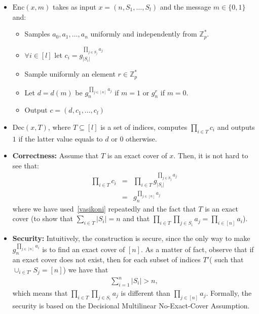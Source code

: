 \begin{itemize}

\item $\mathrm{Enc}(x,m)$ takes as input $x=(n, S_1, \ldots,S_l)$ and the message $m \in \{0,1\}$ and:

\begin{itemize}

\item Samples $a_{0}, a_1, \ldots, a_{n}$ uniformly and independently from $\mathbb{Z}_p^*$.

\item $\forall i \in [l]$ let $c_i = g^{\prod_{j\in S_j} a_j}_{|S_i|}$

\item Sample uniformly an element $r \in \mathbb{Z}_p^*$

\item Let $d = d(m) $ be $  g_n^{\prod_{j \in [n]}a_j}$ if $m = 1 $ or $g_n^r$ if $m = 0$.

\item Output $c = (d, c_1, \ldots,c_l)$
\end{itemize}

\item $\mathrm{Dec}(x,T)$, where $T \subseteq[l]$ is a set of indices, computes $\prod_{i \in T}c_i$ and outputs $1$ if the latter value equals to $d$ or $0$ otherwise.

\end{itemize}


\begin{itemize}

\item \textbf{Correctness:} Assume that $T$ is an exact cover of $x$. Then, it is not hard to see that:
\begin{eqnarray*}
\prod_{i \in T} c_i & = & \prod_{i \in T} g^{\prod_{j\in S_j} a_j}_{|S_i|} \\
& = & g_n^{\prod_{j \in [n]}a_j}
\end{eqnarray*}
where we have used~\eqref{vasikoni} repeatedly and the fact that $T$ is an exact cover (to show that $\sum_{i \in T} |S_i| = n$ and that $\prod_{i \in T} \prod_{j \in S_i} a_j = \prod_{i \in [n]} a_i$).

\item \textbf{Security:} Intuitively, the construction is secure, since the only way to make $g_n^{\prod_{ j \in [n] }a_i}$ is to find an exact cover of $[n]$.  As a matter of fact, observe that if an exact cover does not exist, then for each subset of indices $T'$( such that $\cup_{i \in T'}S_j  = [n]$) we have that
\begin{align*}
\sum_{i =1 }^{n} |S_i| > n,
\end{align*}
which means that   $\prod_{i \in T} \prod_{j \in S_i} a_j$ is different than $\prod_{j \in [n]}a_j$. Formally, the security is based on the Decisional Multilinear No-Exact-Cover Assumption.

\end{itemize}


%
%



